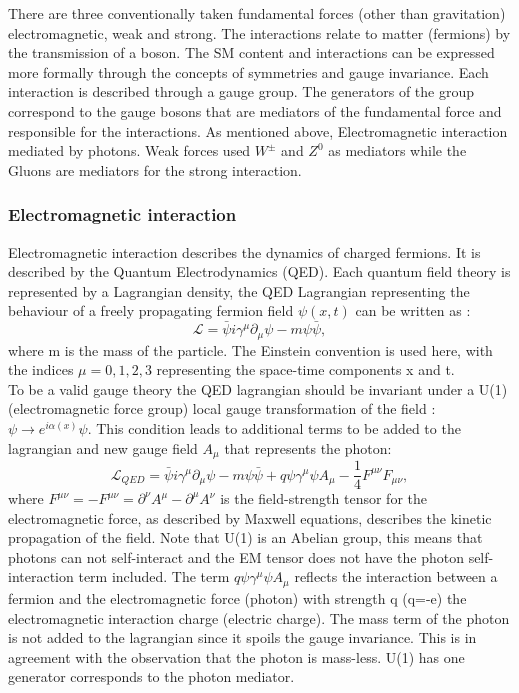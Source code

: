There are three conventionally taken fundamental forces (other than gravitation) electromagnetic, weak and strong. The interactions relate to matter (fermions) by the transmission of a boson. The SM content and interactions can be expressed more formally through the concepts of symmetries and gauge invariance. Each interaction is described through a gauge group. The generators of the group correspond to the gauge bosons that are mediators of the fundamental force and responsible for the interactions. As mentioned above, Electromagnetic interaction mediated by photons. Weak forces used $W^{\pm}$ and $Z^{0}$ as mediators while the Gluons are mediators for the strong interaction.
\subsubsection{Electromagnetic interaction}
Electromagnetic interaction describes the dynamics of charged fermions. It is described by the Quantum Electrodynamics (QED). Each quantum field theory is represented by a Lagrangian density, the QED Lagrangian representing the behaviour of a freely propagating fermion field $\psi (x,t)$ can be written as : 
\begin{equation}
    \mathcal{L} = \bar{\psi}i\gamma^\mu\partial_\mu\psi - m\psi\bar{\psi},
\end{equation}
where m is the mass of the particle. The Einstein convention is used here, with the indices $\mu= 0,1,2,3$ representing the space-time components x and t. \\ 
To be a valid gauge theory the QED lagrangian should be invariant under a U(1) (electromagnetic force group) local gauge transformation of the field : $\psi\rightarrow e^{i\alpha(x)}\psi$. This condition leads to additional terms to be added to the lagrangian and new gauge field $A_{\mu}$ that represents the photon:
\begin{equation}
    \mathcal{L}_{QED} = \bar{\psi}i\gamma^\mu\partial_\mu\psi - m\psi\bar{\psi} + q\psi\gamma^{\mu}\psi A_{\mu} - \frac{1}{4}F^{\mu\nu}F_{\mu\nu},
\end{equation}
where $F^{\mu\nu} = - F^{\mu\nu} = \partial^{\nu}A^{\mu} - \partial^{\mu}A^{\nu}$ is the field-strength tensor for the electromagnetic force, as described by Maxwell equations, describes the kinetic propagation of the field. Note that U(1) is an Abelian group, this means that photons can not self-interact and the EM tensor does not have the photon self-interaction term included. The term $q\psi\gamma^{\mu}\psi A_{\mu}$ reflects the interaction between a fermion and the electromagnetic force (photon) with strength q (q=-e) the electromagnetic interaction charge (electric charge). The mass term of the photon is not added to the lagrangian since it spoils the gauge invariance. This is in agreement with the observation that the photon is mass-less. U(1) has one generator corresponds to the photon mediator.

